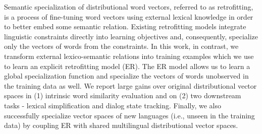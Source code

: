 Semantic specialization of distributional word vectors, referred to as retrofitting, is a process of fine-tuning word vectors using external lexical knowledge in order to better embed some semantic relation. Existing retrofitting models integrate linguistic constraints directly into learning objectives and, consequently, specialize only the vectors of words from the constraints. In this work, in contrast, we transform external lexico-semantic relations into training examples which we use to learn an explicit retrofitting model (ER). The ER model allows us to learn a global specialization function and specialize the vectors of words unobserved in the training data as well. We report large gains over original distributional vector spaces in (1) intrinsic word similarity evaluation and on (2) two downstream tasks - lexical simplification and dialog state tracking. Finally, we also successfully specialize vector spaces of new languages (i.e., unseen in the training data) by coupling ER with shared multilingual distributional vector spaces.
